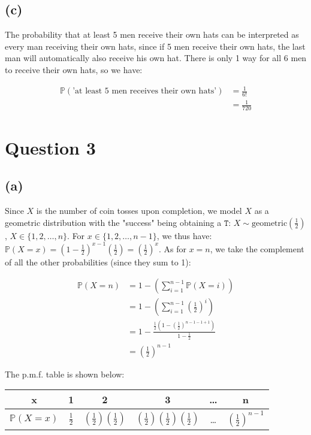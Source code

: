 \documentclass[12pt]{article}
\begin{document}
\subsection*{(c)}

The probability that at least 5 men receive their own hats can be interpreted as every man receiving their own hats, since if 5 men receive their own hats, the last man will automatically also receive his own hat. There is only 1 way for all 6 men to receive their own hats, so we have:


\begin{align*}
    \mathbb{P}(\text{'at least 5 men receives their own hats'}) &= \frac{1}{6!} \\ 
    &= \boxed{\frac{1}{720}}
\end{align*}

\newpage 

\section*{Question 3}

\subsection*{(a)}
Since $X$ is the number of coin tosses upon completion, we model $X$ as a geometric distribution with the "success" being obtaining a $\mathtt{T}$: $X \sim \text{geometric}(\frac{1}{2})$, $X \in \{1,2,\dots,n\}$. For $x\in \{1, 2, \dots, n-1\}$, we thus have: $\mathbb{P}(X = x) = (1-\frac{1}{2})^{x-1}(\frac{1}{2}) = (\frac{1}{2})^{x}$. As for $x = n$, we take the complement of all the other probabilities (since they sum to 1):

\begin{align*}
    \mathbb{P}(X = n) &= 1 - \left(\sum_{i=1}^{n-1} \mathbb{P}(X = i)\right) \\ 
    &= 1 - \left( \sum_{i=1}^{n-1} \left(\frac{1}{2}\right)^{i} \right) \\ 
    &= 1 - \frac{\frac{1}{2}(1 - (\frac{1}{2})^{n-1-1+1})}{1- \frac{1}{2}} \\ 
    &= \left(\frac{1}{2}\right)^{n-1}
\end{align*}


\noindent The p.m.f. table is shown below: \\ 

\begin{center}
    \begin{tabular}{|c | c | c | c | c | c |}
       \hline 
       x & 1 & 2 & 3 & \dots & n \\ \hline 
       $\mathbb{P}(X = x)$ & $\frac{1}{2}$ & $(\frac{1}{2})(\frac{1}{2})$ & $(\frac{1}{2})(\frac{1}{2})(\frac{1}{2})$ & \dots & $(\frac{1}{2})^{n-1}$ \\ \hline
    \end{tabular}
\end{center} 
\end{document}
